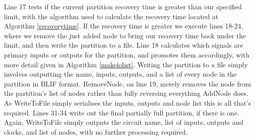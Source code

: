 \documentclass[12pt,final,oneside]{dwThesis} %
\begin{document}
   Line 17 tests if the current partition recovery time is greater than our specified limit, with the algorithm used to calculate the recovery time located at Algorithm \ref{recoverytime}.
   If the recovery time is greater we execute lines 18-24, where we remove the just added node to bring our recovery time back under the limit, and then write the partition to a file.
   Line 18 calculates which signals are primary inputs or outputs for the partition, and promotes them accordingly, with more detail given in Algorithm \ref{makeiolist}.
   Writing the partition to a file simply involves outputting the name, inputs, outputs, and a list of every node in the partition in \ac{BLIF} format.
   RemoveNode, on line 19, merely removes the node from the partition's list of nodes rather than fully reversing everything AddNode does. As WriteToFile simply serialises the inputs, outputs and node list this is all that's required.
   Lines 31-34 write out the final partially full partition, if there is one. Again, WriteToFile simply outputs the circuit name, list of inputs, outputs and clocks, and list of nodes, with no further processing required.


   \newpage
\end{document}
